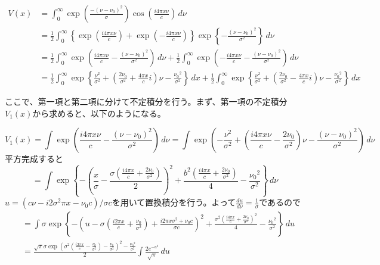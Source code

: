 \documentclass[uplatex, titlepage, fontsize=10pt, paper=a4paper]{jsarticle}
\numberwithin{equation}{section}
\begin{document}
\begin{equation}
    \begin{split}
        V(x)&=\int_{0}^{\infty} \exp\left(\frac{-(\nu-\nu_0)^2}{\sigma}\right)\cos\left(\frac{i4{\pi}x{\nu}}{c}\right) \,d\nu \\
        &=\frac{1}{2}\int_{0}^{\infty} \left\{\exp\left(\frac{i4{\pi}x{\nu}}{c}\right)+\exp\left(-\frac{i4{\pi}x{\nu}}{c}\right)\right\}\exp\left\{-\frac{(\nu-\nu_0)^2}{\sigma^2}\right\} \,d\nu \\
        &=\frac{1}{2}\int_{0}^{\infty} \exp\left(\frac{i4{\pi}x{\nu}}{c}-\frac{(\nu-\nu_0)^2}{\sigma^2}\right) \,d\nu + \frac{1}{2}\int_{0}^{\infty} \exp\left(-\frac{i4{\pi}x{\nu}}{c}-\frac{(\nu-\nu_0)^2}{\sigma^2}\right) \,d\nu \\
        &=\frac{1}{2}\int_{0}^{\infty} \exp\left\{\frac{{\nu}^2}{\sigma^2}+\left(\frac{2\nu_0}{\sigma^2}+\frac{4{\pi}x}{c}i\right)\nu-\frac{{\nu_0}^2}{\sigma^2}\right\} \,dx + \frac{1}{2}\int_{0}^{\infty} \exp\left\{\frac{{\nu}^2}{\sigma^2}+\left(\frac{2\nu_0}{\sigma^2}-\frac{4{\pi}x}{c}i\right)\nu-\frac{{\nu_0}^2}{\sigma^2}\right\} \,dx
    \end{split}
    \label{equation_V_task}
\end{equation}

ここで、第一項と第二項に分けて不定積分を行う。まず、第一項の不定積分$V_1(x)$から求めると、以下のようになる。

\begin{equation}
    V_1(x) = \int \exp\left(\frac{i4{\pi}x{\nu}}{c}-\frac{(\nu-\nu_0)^2}{\sigma^2}\right) \,d\nu =\int \exp\left(-\frac{\nu^2}{\sigma^2}+\left(\frac{i4{\pi}x{\nu}}{c}-\frac{2\nu_0}{\sigma^2}\right)\nu-\frac{(\nu-\nu_0)^2}{\sigma^2}\right) \,d\nu
    \label{equation_V_1_first}
\end{equation}
平方完成すると
\begin{equation}
    =\int \exp\left\{-\left(\frac{x}{\sigma}-\frac{\sigma\left(\frac{i4{\pi}x}{c}+\frac{2\nu_0}{\sigma^2}\right)}{2}\right)^2+\frac{b^2\left(\frac{i4{\pi}x}{c}+\frac{2\nu_0}{\sigma^2}\right)}{4}-\frac{{\nu_0}^2}{\sigma^2}\right\} \,d\nu
\end{equation}
$u=(c\nu-i2{\sigma^2}{\pi}x-{\nu_0}c)/{\sigma}c$を用いて置換積分を行う。よって$\frac{du}{d\nu}=\frac{1}{\sigma}$であるので
\begin{equation}
    \begin{split}
        &=\int \sigma \exp\left\{-\left(u-\sigma\left(\frac{i2{\pi}x}{c}+\frac{\nu_0}{\sigma^2}\right)+\frac{i2{\pi}x{\sigma}^2+{\nu_0}c}{{\sigma}c}\right)^2+\frac{\sigma^2\left(\frac{i4{\pi}x}{c}+\frac{2\nu_0}{\sigma^2}\right)^2}{4}-\frac{{\nu_0}^2}{\sigma^2}\right\} \,du \\
        &=\frac{\sqrt{\pi}\sigma\exp\left(\sigma^2\left(\frac{i2{\pi}x}{c}-\frac{\nu_0}{\sigma^2}\right)-\frac{\nu_0}{\sigma^2}\right)^2-\frac{{\nu_0}^2}{\sigma^2}}{2}\int \frac{2e^{-u^2}}{\sqrt{\pi}} \,du
    \end{split}
\end{equation}
\end{document}
